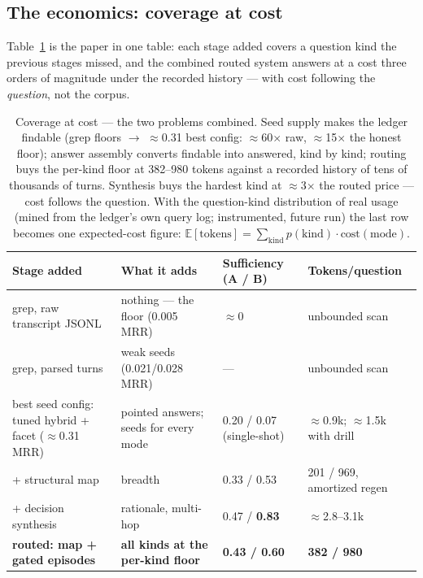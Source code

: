 \documentclass[twocolumn,10pt]{article}
\newcommand{\x}{$\times$}
\begin{document}
\subsection{The economics: coverage at cost}\label{sec:economics}

Table~\ref{tab:waterfall} is the paper in one table: each stage added covers a question kind the previous stages missed, and the combined routed system answers at a cost three orders of magnitude under the recorded history --- with cost following the \emph{question}, not the corpus.

\begin{table}[t]
\centering\footnotesize
\begin{tabular}{@{}p{}p{}p{}p{}@{}}
\toprule
\textbf{Stage added} & \textbf{What it adds} & \textbf{Sufficiency (A / B)} & \textbf{Tokens/question}\\
\midrule
grep, raw transcript JSONL & nothing --- the floor (0.005 MRR) & $\approx$0 & unbounded scan\\
grep, parsed turns & weak seeds (0.021/0.028 MRR) & --- & unbounded scan\\
best seed config: tuned hybrid + facet ($\approx$0.31 MRR) & pointed answers; seeds for every mode & 0.20 / 0.07 (single-shot) & $\approx$0.9k; $\approx$1.5k with drill\\
+ structural map & breadth & 0.33 / 0.53 & 201 / 969, amortized regen\\
+ decision synthesis & rationale, multi-hop & 0.47 / \textbf{0.83} & $\approx$2.8--3.1k\\
\textbf{routed: map + gated episodes} & \textbf{all kinds at the per-kind floor} & \textbf{0.43 / 0.60} & \textbf{382 / 980}\\
\bottomrule
\end{tabular}
\caption{Coverage at cost --- the two problems combined. Seed supply makes the ledger findable (grep floors $\to$ $\approx$0.31 best config: $\approx$60\x{} raw, $\approx$15\x{} the honest floor); answer assembly converts findable into answered, kind by kind; routing buys the per-kind floor at 382--980 tokens against a recorded history of tens of thousands of turns. Synthesis buys the hardest kind at $\approx$3\x{} the routed price --- cost follows the question. With the question-kind distribution of real usage (mined from the ledger's own query log; instrumented, future run) the last row becomes one expected-cost figure: $\mathbb{E}[\text{tokens}] = \sum_{\text{kind}} p(\text{kind}) \cdot \text{cost}(\text{mode})$.}
\label{tab:waterfall}
\end{table}
\end{document}
